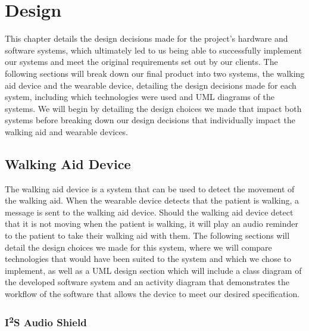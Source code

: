 \chapter{Design}
        \label{ch:design}
        
            This chapter details the design decisions made for the project's hardware and software systems, which ultimately led to us being able to successfully implement our systems and meet the original requirements set out by our clients. The following sections will break down our final product into two systems, the walking aid device and the wearable device, detailing the design decisions made for each system, including which technologies were used and UML diagrams of the systems. We will begin by detailing the design choices we made that impact both systems before breaking down our design decisions that individually impact the walking aid and wearable devices.
        
            \section{Walking Aid Device}
            \label{sec:walking_aid}
        
                The walking aid device is a system that can be used to detect the movement of the walking aid. When the wearable device detects that the patient is walking, a message is sent to the walking aid device. Should the walking aid device detect that it is not moving when the patient is walking, it will play an audio reminder to the patient to take their walking aid with them. The following sections will detail the design choices we made for this system, where we will compare technologies that would have been suited to the system and which we chose to implement, as well as a UML design section which will include a class diagram of the developed software system and an activity diagram that demonstrates the workflow of the software that allows the device to meet our desired specification.
        
                \subsection{I\textsuperscript{2}S Audio Shield}
                \label{subsec:i2s_audio_shield}
        
